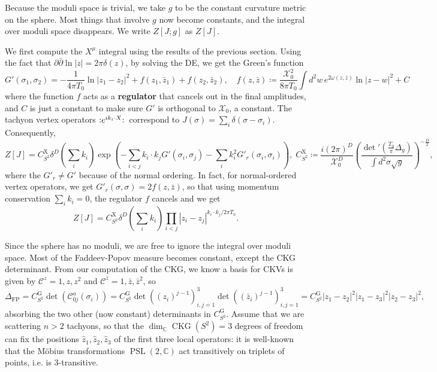 \documentclass{report}
\theoremstyle{plain}
\theoremstyle{definition}
\theoremstyle{remark}
\newcommand{\di}{\partial}
\newcommand{\NO}[1]{\vcentcolon\mathrel{#1}\vcentcolon\,}
\newcommand{\bC}{\mathbb{C}}
\newcommand{\cC}{\mathcal{C}}
\newcommand{\cX}{\mathcal{X}}
\DeclareMathOperator{\PSL}{PSL}
\DeclareMathOperator{\CKG}{CKG}
\newcommand{\bz}{\bar{z}}
\newcommand{\bdi}{\bar{\di}}
\begin{document}
Because the moduli space is trivial, we take $g$ to be the constant
curvature metric on the sphere. Most things that involve $g$ now
become constants, and the integral over moduli space disappears. We
write $Z[J; g]$ as $Z[J]$.

We first compute the $X^\mu$ integral using the results of the
previous section. Using the fact that $\di \bdi \ln |z| = 2\pi
\delta(z)$, by solving the DE, we get the Green's function
\[ G'(\sigma_1, \sigma_2) = -\frac{1}{4\pi T_0} \ln |z_1 - z_2|^2 + f(z_1, \bz_1) + f(z_2, \bz_2), \quad f(z, \bz) \coloneqq \frac{\cX_0^2}{8\pi T_0} \int d^2 w \, e^{2\omega(z,\bz)} \ln |z - w|^2 + C \]
where the function $f$ acts as a {\bf regulator} that cancels out in
the final amplitudes, and $C$ is just a constant to make sure $G'$ is
orthogonal to $\cX_0$, a constant. The tachyon vertex operators
$\NO{e^{ik_i\cdot X}}$ correspond to $J(\sigma) = \sum_i \delta(\sigma
- \sigma_i)$. Consequently,
\[ Z[J] = C_{S^2}^{\text{X}} \delta^D(\sum_i k_i) \exp\left(-\sum_{i < j} k_i \cdot k_j G'(\sigma_i, \sigma_j) - \sum_i k_i^2 G'_r(\sigma_i, \sigma_i)\right), \; C_{S^2}^{\text{X}} \coloneqq \frac{i(2\pi)^D}{\cX_0^D} \left(\frac{\det'(\frac{T_0}{\pi}\Delta_g)}{\int d^2\sigma \sqrt{g}}\right)^{-\frac{D}{2}}, \]
where the $G'_r \neq G'$ because of the normal ordering. In fact, for
normal-ordered vertex operators, we get $G'_r(\sigma, \sigma) = 2f(z,
\bz)$, so that using momentum conservation $\sum_i k_i = 0$, the
regulator $f$ cancels and we get
\[ Z[J] = C_{S^2}^{\text{X}} \delta^D\left(\sum_i k_i\right) \prod_{i<j} |z_i - z_j|^{k_i \cdot k_j/2\pi T_0}. \]

Since the sphere has no moduli, we are free to ignore the integral
over moduli space. Most of the Faddeev-Popov measure becomes constant,
except the CKG determinant. From our computation of the CKG, we know a
basis for CKVs is given by $\cC^z = 1, z, z^2$ and $\cC^{\bz} = 1,
\bz, \bz^2$, so
\[ \Delta_{\text{FP}} = C_{S^2}^{\text{G}} \det(\cC^a_{0j}(\sigma_i)) = C_{S^2}^{\text{G}} \det((z_i)^{j-1})_{i,j=1}^3 \det((\bz_i)^{j-1})_{i,j=1}^3 = C_{S^2}^{\text{G}} |z_1 - z_2|^2 |z_1 - z_3|^2 |z_2 - z_3|^2, \]
absorbing the two other (now constant) determinants in
$C_{S^2}^{\text{G}}$. Assume that we are scattering $n > 2$ tachyons,
so that the $\dim_{\bC} \CKG(S^2) = 3$ degrees of freedom can fix the
positions $\hat{z}_1, \hat{z}_2, \hat{z}_3$ of the first three local
operators: it is well-known that the M\"obius transformations $\PSL(2,
\bC)$ act transitively on triplets of points, i.e. is $3$-transitive.
\end{document}
